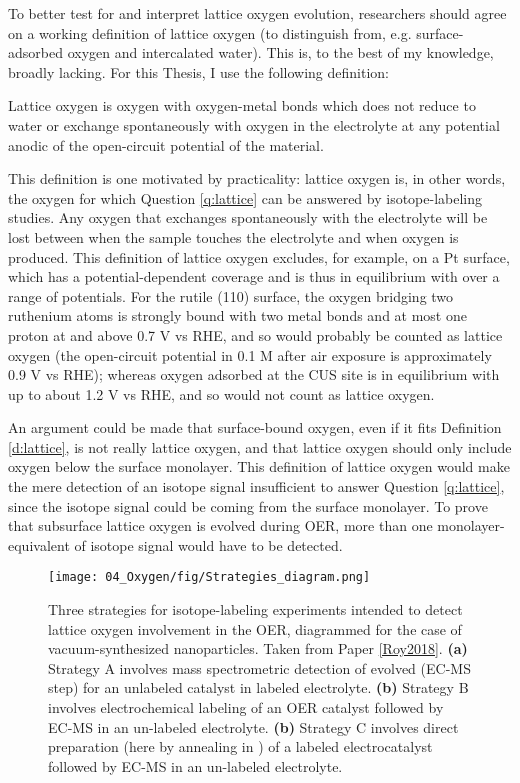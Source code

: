 To better test for and interpret lattice oxygen evolution, researchers should agree on a working definition of lattice oxygen (to distinguish from, e.g. surface-adsorbed oxygen and intercalated water). This is, to the best of my knowledge, broadly lacking. For this Thesis, I use the following definition:

\begin{definition}
	Lattice oxygen is oxygen with oxygen-metal bonds which does not reduce to water or exchange spontaneously with oxygen in the electrolyte at any potential anodic of the open-circuit potential of the material. 
	 \label{d:lattice}
\end{definition}

This definition is one motivated by practicality: lattice oxygen is, in other words, the oxygen for which Question \ref{q:lattice} can be answered by isotope-labeling studies. Any oxygen that exchanges spontaneously with the electrolyte will be lost between when the sample touches the electrolyte and when oxygen is produced. This definition of lattice oxygen excludes, for example,  on a Pt surface, which has a potential-dependent coverage and is thus in equilibrium with  over a range of potentials. For the rutile  (110) surface, the oxygen bridging two ruthenium atoms is strongly bound with two metal bonds and at most one proton at and above 0.7 V vs RHE\cite{Rao2017a}, and so would probably be counted as lattice oxygen (the open-circuit potential in 0.1 M  after air exposure is approximately 0.9 V vs RHE); whereas oxygen adsorbed at the CUS site is in equilibrium with  up to about 1.2 V vs RHE\cite{Rao2017a}, and so would not count as lattice oxygen.

An argument could be made that surface-bound oxygen, even if it fits Definition \ref{d:lattice}, is not really lattice oxygen, and that lattice oxygen should only include oxygen below the surface monolayer. This definition of lattice oxygen would make the mere detection of an isotope signal insufficient to answer Question \ref{q:lattice}, since the isotope signal could be coming from the surface monolayer. To prove that subsurface lattice oxygen is evolved during OER, more than one monolayer-equivalent of isotope signal would have to be detected.

\begin{figure}[h!]
	\centering
	\texttt{[image: 04\_Oxygen/fig/Strategies\_diagram.png]}
	\caption{Three strategies for isotope-labeling experiments intended to detect lattice oxygen involvement in the OER, diagrammed for the case of vacuum-synthesized  nanoparticles. Taken from Paper \ref{Roy2018}. \textbf{(a)} Strategy A involves mass spectrometric detection of evolved  (EC-MS step) for an unlabeled catalyst in labeled electrolyte. \textbf{(b)} Strategy B involves electrochemical labeling of an OER catalyst followed by EC-MS in an un-labeled electrolyte. \textbf{(b)} Strategy C involves direct preparation (here by annealing in ) of a labeled electrocatalyst followed by EC-MS in an un-labeled electrolyte.}
	\label{fig:strategies}
\end{figure}

